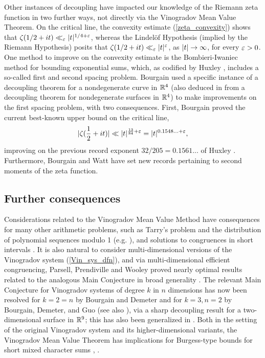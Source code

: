 \documentclass[brochure,english,12pt]{bourbaki}%
\begin{document}
Other instances of decoupling have impacted our knowledge of the Riemann zeta function in two further ways, not directly via the Vinogradov Mean Value Theorem.  On the critical line, the convexity estimate (\ref{zeta_convexity}) shows that $\zeta(1/2+it)\ll_\varepsilon |t|^{1/4+\varepsilon}$,  whereas the Lindel\"{o}f Hypothesis (implied by the Riemann Hypothesis) posits that $\zeta(1/2+it)\ll_\varepsilon |t|^\varepsilon$,  as $|t| \rightarrow \infty$, for every $\varepsilon>0$.  One method to improve on the convexity estimate is the Bombieri-Iwaniec method for bounding exponential sums, which, as codified by Huxley \cite{Hux96}, includes a so-called first and second spacing problem. Bourgain used a specific instance of a decoupling theorem for a nondegenerate curve in $\mathbb{R}^4$ (also deduced in \cite{BouDem16a} from a decoupling theorem for nondegenerate surfaces in $\mathbb{R}^4$) to make improvements on the first spacing problem, with two consequences.
 First, Bourgain \cite{Bou17a} proved   the current best-known upper bound on the critical line,
 \[ |\zeta(\frac{1}{2} + it) | \ll |t|^{\frac{13}{84}+\varepsilon} = |t|^{ 0.1548...+\varepsilon},\]
improving on the previous record exponent $32/205 = 0.1561...$ of Huxley \cite{Hux05}.
 Furthermore, Bourgain and Watt \cite{BouWat15x} have set new records pertaining to second moments of the zeta function.


 
\subsection{Further consequences}

Considerations related to the Vinogradov Mean Value Method have  consequences for many other arithmetic problems, such as Tarry's problem and the distribution of polynomial sequences modulo 1 (e.g. \cite{Woo12a}), and solutions to congruences in short intervals \cite{CCGHSZ14}.
It is also natural to consider multi-dimensional versions of the Vinogradov system (\ref{Vin_sys_dfn}), and via multi-dimensional efficient congruencing, Parsell, Prendiville and Wooley proved nearly optimal results related to the analogous Main Conjecture in broad generality \cite{PPW13}. The relevant Main Conjecture for Vinogradov systems of degree $k$ in $n$ dimensions has now been resolved for $k=2=n$ by Bourgain and Demeter \cite{BouDem15x} and for $k=3,n=2$ by Bourgain, Demeter, and Guo \cite{BDG16x} (see also \cite{BouDem16b}), via a sharp decoupling result for a two-dimensional surface in $\mathbb{R}^9$; this has also been generalized in \cite{Guo17x}. Both in the setting of the original Vinogradov system and its higher-dimensional variants, the Vinogradov Mean Value Theorem has implications for Burgess-type bounds for short mixed character sums \cite{HBP15}, \cite{Pie16}.
\end{document}
